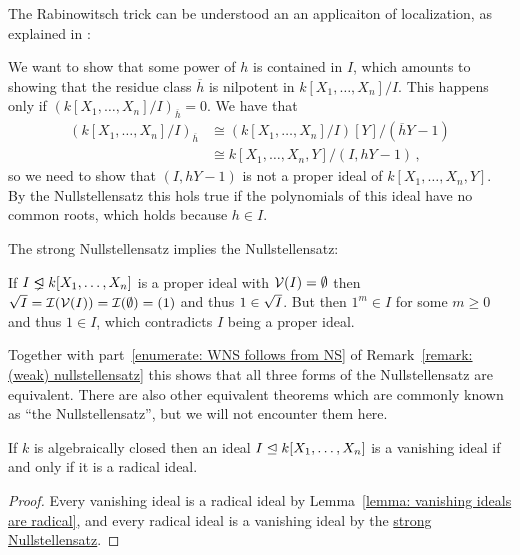 \begin{remark}
  The Rabinowitsch trick can be understood an an applicaiton of localization, as explained in \cite{MO90666}:
  
  We want to show that some power of $h$ is contained in $I$, which amounts to showing that the residue class $\overline{h}$ is nilpotent in $k[X_1, \dotsc, X_n]/I$.
  This happens only if $(k[X_1, \dotsc, X_n]/I)_{\overline{h}} = 0$.
  We have that
  \begin{align*}
            (k[X_1, \dotsc, X_n]/I)_{\overline{h}}
    &\cong  (k[X_1, \dotsc, X_n]/I)[Y]/(\overline{h}Y - 1)  \\
    &\cong  k[X_1, \dotsc, X_n,Y]/(I, hY - 1) \,,
  \end{align*}
  so we need to show that $(I, hY - 1)$ is not a proper ideal of $k[X_1, \dotsc, X_n, Y]$.
  By the Nullstellensatz this hols true if the polynomials of this ideal have no common roots, which holds because $h \in I$.
\end{remark}


\begin{remark}
  The strong Nullstellensatz implies the Nullstellensatz:
  
  If $I \ideallneq k[X_1, \dotsc, X_n]$ is a proper ideal with $\mathcal{V}(I) = \emptyset$ then $\sqrt{I} = \mathcal{I}(\mathcal{V}(I)) = \mathcal{I}(\emptyset) = (1)$ and thus $1 \in \sqrt{I}$.
  But then $1^m \in I$ for some $m \geq 0$ and thus $1 \in I$, which contradicts $I$ being a proper ideal.
  
  Together with part~\ref*{enumerate: WNS follows from NS} of Remark~\ref{remark: (weak) nullstellensatz} this shows that all three forms of the Nullstellensatz are equivalent.
  There are also other equivalent theorems which are commonly known as \enquote{the Nullstellensatz}, but we will not encounter them here.
\end{remark}




\begin{corollary}
  \label{corollary: vanishing ideals are precisely radical ideals}
  If $k$ is algebraically closed then an ideal $I \trianglelefteq k[X_1, \dotsc, X_n]$ is a vanishing ideal if and only if it is a radical ideal.
\end{corollary}


\begin{proof}
  Every vanishing ideal is a radical ideal by Lemma~\ref{lemma: vanishing ideals are radical}, and every radical ideal is a vanishing ideal by the \hyperref[theorem: strong nullstellensatz]{strong Nullstellensatz}.
\end{proof}


